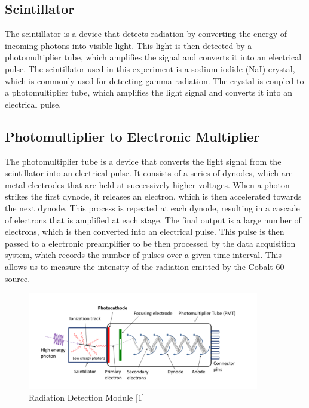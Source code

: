 \documentclass[12pt]{article}
\begin{document}
        \subsection{Scintillator}
            The scintillator is a device that detects radiation by converting the energy of incoming photons into visible light. 
            This light is then detected by a photomultiplier tube, which amplifies the signal and converts it into an electrical pulse. 
            The scintillator used in this experiment is a sodium iodide (NaI) crystal, which is commonly used for detecting gamma radiation. 
            The crystal is coupled to a photomultiplier tube, which amplifies the light signal and converts it into an electrical pulse. 

        \subsection{Photomultiplier to Electronic Multiplier}
            The photomultiplier tube is a device that converts the light signal from the scintillator into an electrical pulse. 
            It consists of a series of dynodes, which are metal electrodes that are held at successively higher voltages. 
            When a photon strikes the first dynode, it releases an electron, which is then accelerated towards the next dynode. 
            This process is repeated at each dynode, resulting in a cascade of electrons that is amplified at each stage. 
            The final output is a large number of electrons, which is then converted into an electrical pulse. 
            This pulse is then passed to a electronic preamplifier to be then processed by the data acquisition system, 
            which records the number of pulses over a given time interval. 
            This allows us to measure the intensity of the radiation emitted by the Cobalt-60 source.

            \begin{figure}[!htb]
                \centering
                \includegraphics[width=0.9\textwidth]{./img/other/module.png}
                \caption{Radiation Detection Module [1]}
                \label{fig:Radiation Detection Module [1]}
            \end{figure}
            
\end{document}
